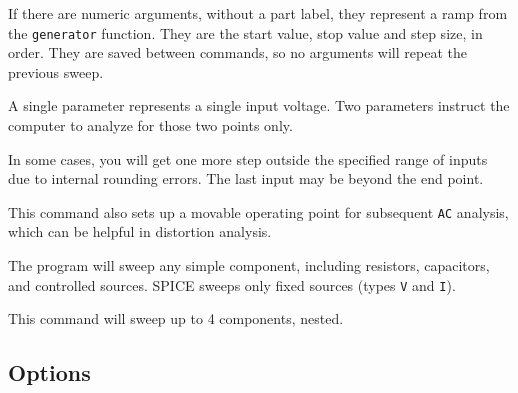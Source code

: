 If there are numeric arguments, without a part label, they represent a ramp
from the {\tt generator} function.  They are the start value, stop value
and step size, in order.  They are saved between commands, so no arguments
will repeat the previous sweep.

A single parameter represents a single input voltage.  Two parameters
instruct the computer to analyze for those two points only.

In some cases, you will get one more step outside the specified range of
inputs due to internal rounding errors.  The last input may be beyond the end
point.

This command also sets up a movable operating point for subsequent {\tt AC}
analysis, which can be helpful in distortion analysis.

The program will sweep any simple component, including resistors,
capacitors, and controlled sources.  SPICE sweeps only fixed sources (types
{\tt V} and {\tt I}).

This command will sweep up to 4 components, nested.
\subsection{Options}

